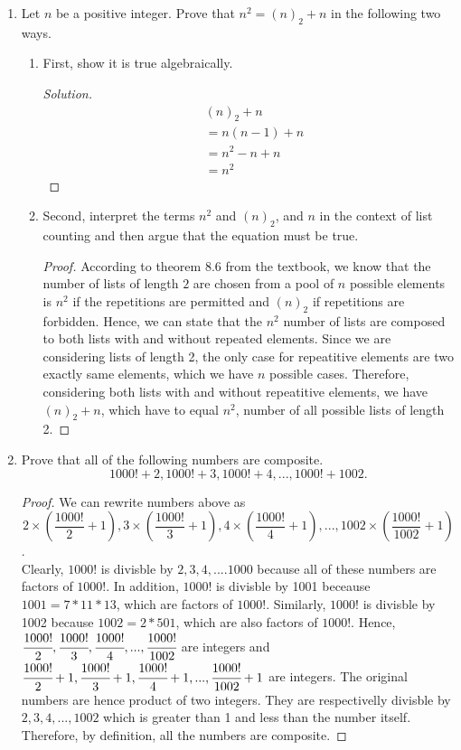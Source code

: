 \documentclass[12pt]{article}
\renewcommand\qedsymbol{$\blacksquare$}
\newenvironment{solution}
{\begin{proof}[Solution]\renewcommand\qedsymbol{$\square$}}
	{\end{proof}}
\begin{document}
	\begin{enumerate}
		    \item 
		Let $n$ be a positive integer. Prove that $n^2 = (n)_2 + n$ in the following two ways.
		
		\begin{enumerate}[label=(\alph*)]
			\item 
			First, show it is true algebraically.
			\begin{solution}
			\begin{align*}
			    &(n)_2 + n\\
				&= n(n-1) + n\\
				&= n^2 - n + n\\
				&= n^2
			\end{align*}
		\end{solution}
		
			\item
			Second, interpret the terms $n^2$ and $(n)_2$, and $n$ in the context of list counting and then argue that the equation must be true.
			\begin{proof}
					According to theorem 8.6 from the textbook, we know that the number of lists of length $2$ are chosen from a pool of $n$ possible elements is $n^2$ if the repetitions are permitted and $(n)_2$ if repetitions are forbidden.
					Hence, we can state that the $n^2$ number of lists are composed to both lists with and without repeated elements. Since we are considering lists of length 2, the only case for repeatitive elements are two exactly same elements, which we have $n$ possible cases. Therefore, considering both lists with and without repeatitive elements, we have $(n)_2 + n$, which have to equal $n^2$, number of all possible lists of length 2. 
			\end{proof}
		
			
		\end{enumerate}
		
		\item
		Prove that all of the following numbers are composite.
		\[1000! + 2,  1000! + 3,  1000! + 4, . . . ,  1000! + 1002.\]
		\begin{proof}
		We can rewrite numbers above as \[2 \times (\frac{1000!}{2} + 1), 3\times (\frac{1000!}{3} + 1),4 \times(\frac{1000!}{4} + 1),..., 1002 \times (\frac{1000!}{1002} + 1) \]. \\Clearly, $1000!$ is divisble by $2,3,4,....1000$ because all of these numbers are factors of $1000!$. In addition, $1000!$ is divisble by 1001 beceause $1001=7*11*13$, which are factors of $1000!$. Similarly, $1000!$ is divisble by 1002 because $1002=2*501$, which are also factors of $1000!$. Hence, $\cfrac{1000!}{2} ,\cfrac{1000!}{3} ,\cfrac{1000!}{4},...,\cfrac{1000!}{1002} $ are integers and $\cfrac{1000!}{2} +1 ,\cfrac{1000!}{3} +1 ,\cfrac{1000!}{4} +1 ,...,\cfrac{1000!}{1002} +1$ are integers. The original numbers are hence product of two integers. They are respectivelly divisble by $2,3,4,...,1002$ which is greater than 1 and less than the number itself. Therefore, by definition, all the numbers are composite.
	\end{proof}
		

\end{enumerate}
\end{document}
